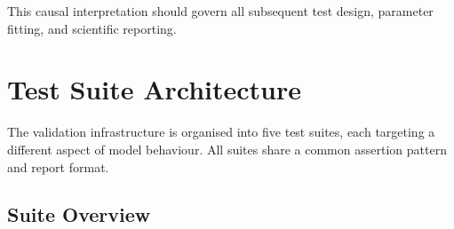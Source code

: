 \documentclass[11pt]{article}
\begin{document}
This causal interpretation should govern all subsequent test design,
parameter fitting, and scientific reporting.

\section{Test Suite Architecture}
\label{sec:suites}

The validation infrastructure is organised into five test suites, each
targeting a different aspect of model behaviour.  All suites share a common
assertion pattern and report format.

\subsection{Suite Overview}
\end{document}
